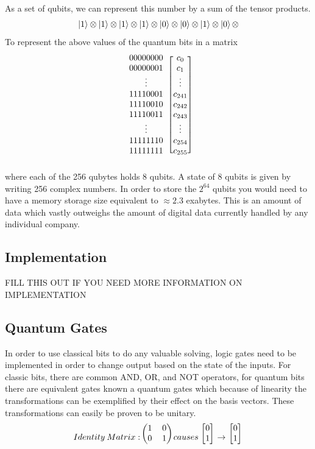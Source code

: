 \documentclass[12pt]{article}
\begin{document}
As a set of qubits, we can represent this number by a sum of the tensor products. 
$$ \ket{1}\otimes\ket{1}\otimes\ket{1}\otimes\ket{1}\otimes\ket{0}\otimes\ket{0}\otimes\ket{1}\otimes\ket{0}\otimes $$
To represent the above values of the quantum bits in a matrix 
$$ 
\begin{blockarray}{cc}
\begin{block}{c[c]}
00000000 & c_0 \\
00000001 & c_1 \\
\vdots & \vdots \\
11110001 & c_{241} \\
11110010 & c_{242} \\ 
11110011 & c_{243} \\ 
\vdots & \vdots \\
11111110 & c_{254} \\
11111111 & c_{255} \\
\end{block}
\end{blockarray}
$$
where each of the 256 qubytes holds 8 qubits. A state of 8 qubits is given by writing 256 complex numbers. In order to store the $2^{64}$ qubits you would need to have a memory storage size equivalent to $\approx 2.3$ exabytes. This is an amount of data which vastly outweighs the amount of digital data currently handled by any individual company. \cite{storage}
\subsection{Implementation}
FILL THIS OUT IF YOU NEED MORE INFORMATION ON IMPLEMENTATION
\subsection{Quantum Gates}
In order to use classical bits to do any valuable solving, logic gates need to be implemented in order to change output based on the state of the inputs. For classic bits, there are common AND, OR, and NOT operators, for quantum bits there are equivalent gates known a quantum gates which because of linearity the transformations can be exemplified by their effect on the basis vectors. These transformations can easily be proven to be unitary.
$$
Identity\:Matrix: 
\begin{blockarray}{cc}
\begin{block}{(cc)}
1 & 0\\
0 & 1\\
\end{block}
\end{blockarray}
 \:causes\:
\begin{blockarray}{c}
\begin{block}{[c]}
0\\
1\\
\end{block}
\end{blockarray}
\rightarrow
\begin{blockarray}{c}
\begin{block}{[c]}
0\\
1\\
\end{block}
\end{blockarray}
\\
$$
\end{document}
